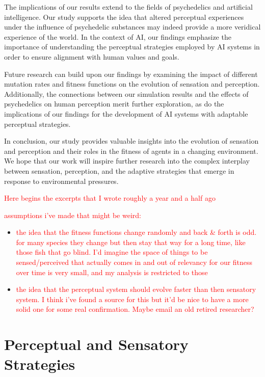 \documentclass{article}[10pt]
\begin{document}
The implications of our results extend to the fields of psychedelics and artificial intelligence. Our study supports the idea that altered perceptual experiences under the influence of psychedelic substances may indeed provide a more veridical experience of the world. In the context of AI, our findings emphasize the importance of understanding the perceptual strategies employed by AI systems in order to ensure alignment with human values and goals.

Future research can build upon our findings by examining the impact of different mutation rates and fitness functions on the evolution of sensation and perception. Additionally, the connections between our simulation results and the effects of psychedelics on human perception merit further exploration, as do the implications of our findings for the development of AI systems with adaptable perceptual strategies.

In conclusion, our study provides valuable insights into the evolution of sensation and perception and their roles in the fitness of agents in a changing environment. We hope that our work will inspire further research into the complex interplay between sensation, perception, and the adaptive strategies that emerge in response to environmental pressures.


\begin{center}
    \textcolor{red}{Here begins the excerpts that I wrote roughly a year and a half ago}
\end{center}

\textcolor{red}{assumptions i've made that might be weird:}
\begin{itemize}
    \item \textcolor{red}{the idea that the fitness functions change randomly and back \& forth is odd. for many species they change but then stay that way for a long time, like those fish that go blind. I'd imagine the space of things to be sensed/perceived that actually comes in and out of relevancy for our fitness over time is very small, and my analysis is restricted to those}
    \item \textcolor{red}{the idea that the perceptual system should evolve faster than then sensatory system. I think i've found a source for this \cite{roth2013long} but it'd be nice to have a more solid one for some real confirmation. Maybe email an old retired researcher?}
\end{itemize}



\section{Perceptual and Sensatory Strategies}
\end{document}
